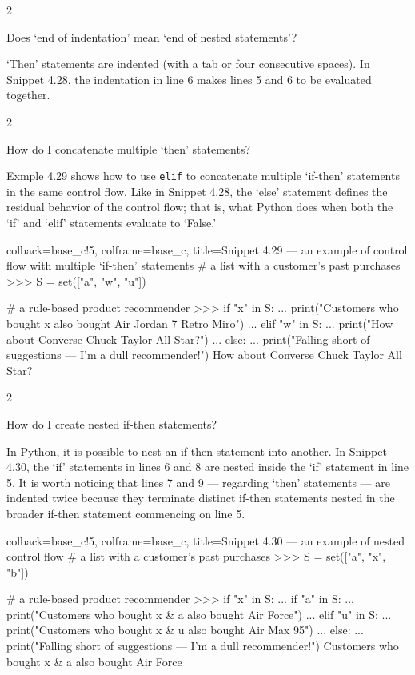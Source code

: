 \documentclass[a4paper,11pt]{book}
\newcommand{\question}[1]{%
    \begin{tcolorbox}[colback=comp_c!10,colframe=comp_c,sidebyside align=top,width=\linewidth,before skip=1ex]
        #1
    \end{tcolorbox}
    \switchcolumn%
}
\newcommand{\note}[1]{%
    \begin{tcolorbox}[colback=white!0,colframe=white!10,width=\linewidth,before skip=1ex]
        #1
    \end{tcolorbox}
}
\begin{document}
\begin{paracol}{2}
	\question{\raggedright Does `end of indentation' mean `end of nested statements'?}
	\note{`Then' statements are indented (with a tab or four consecutive spaces). In Snippet 4.28, the indentation in line 6 makes lines 5 and 6 to be evaluated together.}
\end{paracol}

\begin{paracol}{2}
\question{\raggedright How do I concatenate multiple `then' statements?}
\note{Exmple 4.29 shows how to use \texttt{elif} to concatenate multiple `if-then' statements in the same control flow. Like in Snippet 4.28, the `else' statement defines the residual behavior of the control flow; that is, what Python does when both the `if' and `elif' statements evaluate to `False.'}
\end{paracol}

\begin{pythoncode}[linenos=true,]{colback=base_c!5, colframe=base_c, title=\sffamily Snippet 4.29 --- an example of control flow with multiple `if-then' statements}
# a list with a customer's past purchases
>>> S = set(["a", "w", "u"])

# a rule-based product recommender 
>>> if "x" in S:
...     print("Customers who bought x also bought Air Jordan 7 Retro Miro")
... elif "w" in S:
...     print("How about Converse Chuck Taylor All Star?")
... else:
...     print("Falling short of suggestions --- I'm a dull recommender!")
How about Converse Chuck Taylor All Star?
\end{pythoncode}

\begin{paracol}{2}
\question{\raggedright How do I create nested if-then statements?}
\note{In Python, it is possible to nest an if-then statement into another. In Snippet 4.30, the `if' statements in lines 6 and 8 are nested inside the `if' statement in line 5. It is worth noticing that lines 7 and 9 --- regarding `then' statements --- are indented twice because they terminate distinct if-then statements nested in the broader if-then statement commencing on line 5.}
\end{paracol}

\begin{pythoncode}[linenos=true,]{colback=base_c!5, colframe=base_c, title=\sffamily Snippet 4.30 --- an example of nested control flow}
# a list with a customer's past purchases
>>> S = set(["a", "x", "b"])

# a rule-based product recommender 
>>> if "x" in S:
...     if "a" in S:
...         print("Customers who bought x & a also bought Air Force")
...     elif "u" in S:
...         print("Customers who bought x & u also bought Air Max 95")
... else:
...    print("Falling short of suggestions --- I'm a dull recommender!") 
Customers who bought x & a also bought Air Force
\end{pythoncode}
\end{document}
